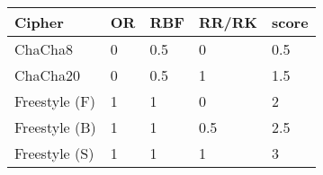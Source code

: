 \begin{table}[]
  \begin{tabular}{@{}lllll@{}}
  \toprule
  \textbf{Cipher} & \textbf{OR} & \textbf{RBF} & \textbf{RR/RK} & \textbf{score} \\ \midrule
  ChaCha8         & 0           & 0.5          & 0              & 0.5            \\
  ChaCha20        & 0           & 0.5          & 1              & 1.5            \\
  Freestyle (F)   & 1           & 1            & 0              & 2              \\
  Freestyle (B)   & 1           & 1            & 0.5            & 2.5            \\
  Freestyle (S)   & 1           & 1            & 1              & 3
  \end{tabular}
  \caption{}
  \label{tbl:security-quant}
\end{table}
